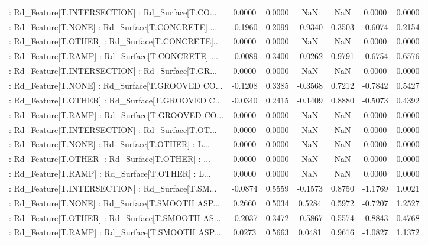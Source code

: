\begin{longtable}{p{4cm}cccccc}
 : Rd\_Feature[T.INTERSECTION] : Rd\_Surface[T.CO... &  0.0000 &    0.0000 &     NaN &          NaN &  0.0000 &  0.0000 \\
 : Rd\_Feature[T.NONE] : Rd\_Surface[T.CONCRETE] ... & -0.1960 &    0.2099 & -0.9340 &       0.3503 & -0.6074 &  0.2154 \\
 : Rd\_Feature[T.OTHER] : Rd\_Surface[T.CONCRETE]... &  0.0000 &    0.0000 &     NaN &          NaN &  0.0000 &  0.0000 \\
 : Rd\_Feature[T.RAMP] : Rd\_Surface[T.CONCRETE] ... & -0.0089 &    0.3400 & -0.0262 &       0.9791 & -0.6754 &  0.6576 \\
 : Rd\_Feature[T.INTERSECTION] : Rd\_Surface[T.GR... &  0.0000 &    0.0000 &     NaN &          NaN &  0.0000 &  0.0000 \\
 : Rd\_Feature[T.NONE] : Rd\_Surface[T.GROOVED CO... & -0.1208 &    0.3385 & -0.3568 &       0.7212 & -0.7842 &  0.5427 \\
 : Rd\_Feature[T.OTHER] : Rd\_Surface[T.GROOVED C... & -0.0340 &    0.2415 & -0.1409 &       0.8880 & -0.5073 &  0.4392 \\
 : Rd\_Feature[T.RAMP] : Rd\_Surface[T.GROOVED CO... &  0.0000 &    0.0000 &     NaN &          NaN &  0.0000 &  0.0000 \\
 : Rd\_Feature[T.INTERSECTION] : Rd\_Surface[T.OT... &  0.0000 &    0.0000 &     NaN &          NaN &  0.0000 &  0.0000 \\
 : Rd\_Feature[T.NONE] : Rd\_Surface[T.OTHER] : L... &  0.0000 &    0.0000 &     NaN &          NaN &  0.0000 &  0.0000 \\
 : Rd\_Feature[T.OTHER] : Rd\_Surface[T.OTHER] : ... &  0.0000 &    0.0000 &     NaN &          NaN &  0.0000 &  0.0000 \\
 : Rd\_Feature[T.RAMP] : Rd\_Surface[T.OTHER] : L... &  0.0000 &    0.0000 &     NaN &          NaN &  0.0000 &  0.0000 \\
 : Rd\_Feature[T.INTERSECTION] : Rd\_Surface[T.SM... & -0.0874 &    0.5559 & -0.1573 &       0.8750 & -1.1769 &  1.0021 \\
 : Rd\_Feature[T.NONE] : Rd\_Surface[T.SMOOTH ASP... &  0.2660 &    0.5034 &  0.5284 &       0.5972 & -0.7207 &  1.2527 \\
 : Rd\_Feature[T.OTHER] : Rd\_Surface[T.SMOOTH AS... & -0.2037 &    0.3472 & -0.5867 &       0.5574 & -0.8843 &  0.4768 \\
 : Rd\_Feature[T.RAMP] : Rd\_Surface[T.SMOOTH ASP... &  0.0273 &    0.5663 &  0.0481 &       0.9616 & -1.0827 &  1.1372 \\

\end{longtable}
